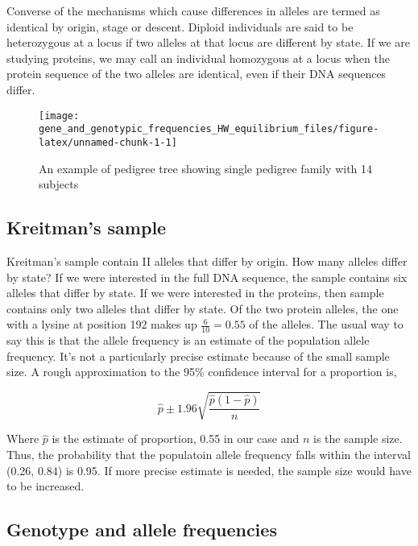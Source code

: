 \documentclass[nofonts,]{tufte-handout}
\begin{document}
Converse of the mechanisms which cause differences in alleles are termed
as identical by origin, stage or descent. Diploid individuals are said
to be heterozygous at a locus if two alleles at that locus are different
by state. If we are studying proteins, we may call an individual
homozygous at a locus when the protein sequence of the two alleles are
identical, even if their DNA sequences differ.

\begin{figure}
\texttt{[image: gene\_and\_genotypic\_frequencies\_HW\_equilibrium\_files/figure-latex/unnamed-chunk-1-1]} \caption[An example of pedigree tree showing single pedigree family with 14 subjects]{An example of pedigree tree showing single pedigree family with 14 subjects}\label{fig:unnamed-chunk-1}
\end{figure}

\hypertarget{kreitmans-sample}{%
\subsection{Kreitman's sample}\label{kreitmans-sample}}

Kreitman's sample contain II alleles that differ by origin. How many
alleles differ by state? If we were interested in the full DNA sequence,
the sample contains six alleles that differ by state. If we were
interested in the proteins, then sample contains only two alleles that
differ by state. Of the two protein alleles, the one with a lysine at
position 192 makes up \(\frac{6}{10} = 0.55\) of the alleles. The usual
way to say this is that the allele frequency is an estimate of the
population allele frequency. It's not a particularly precise estimate
because of the small sample size. A rough approximation to the 95\%
confidence interval for a proportion is,

\[
\hat{p} \pm 1.96 \sqrt{\frac{\hat{p}(1-\hat{p})}{n}}
\]

Where \(\hat{p}\) is the estimate of proportion, 0.55 in our case and
\(n\) is the sample size. Thus, the probability that the populatoin
allele frequency falls within the interval (0.26, 0.84) is 0.95. If more
precise estimate is needed, the sample size would have to be increased.

\hypertarget{genotype-and-allele-frequencies}{%
\subsection{Genotype and allele
frequencies}\label{genotype-and-allele-frequencies}}
\end{document}
